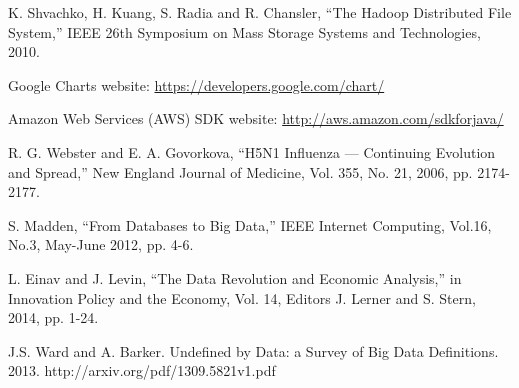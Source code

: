 \documentclass[10pt, conference, compsocconf]{IEEEtran}
\begin{document}
\begin{thebibliography}{00}
K. Shvachko, H. Kuang, S. Radia and R. Chansler, ``The Hadoop Distributed File System,'' IEEE 26th Symposium on Mass Storage Systems and Technologies, 2010.

Google Charts website: \url{https://developers.google.com/chart/}

Amazon Web Services (AWS) SDK website: \url{http://aws.amazon.com/sdkforjava/}

R. G. Webster and E. A. Govorkova, ``H5N1 Influenza — Continuing Evolution and Spread,'' New England Journal of Medicine, Vol. 355, No. 21, 2006, pp. 2174-2177.

S. Madden, ``From Databases to Big Data,'' IEEE Internet Computing, Vol.16, No.3, May-June 2012, pp. 4-6.

L. Einav and J. Levin, ``The Data Revolution and Economic Analysis,'' in Innovation Policy and the Economy, Vol. 14, Editors J. Lerner and S. Stern, 2014, pp. 1-24.

J.S. Ward and A. Barker. Undefined by Data: a Survey of Big Data Definitions. 2013. http://arxiv.org/pdf/1309.5821v1.pdf

\end{thebibliography}
\end{document}
